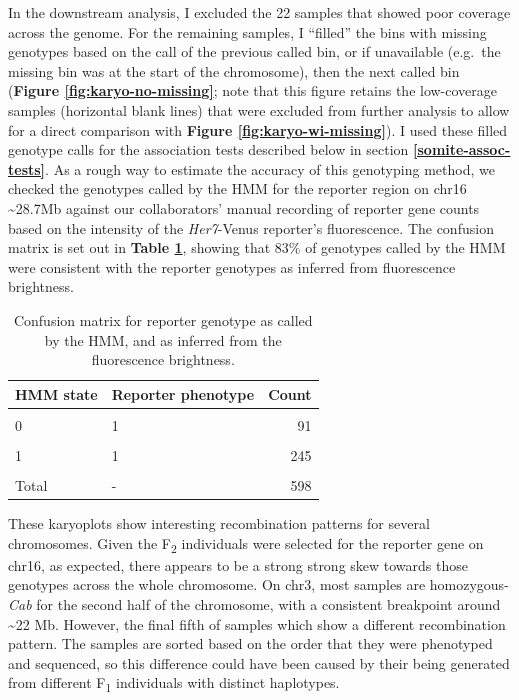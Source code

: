 \documentclass[
]{book}
\begin{document}
In the downstream analysis, I excluded the 22 samples that showed poor coverage across the genome. For the remaining samples, I ``filled'' the bins with missing genotypes based on the call of the previous called bin, or if unavailable (e.g.~the missing bin was at the start of the chromosome), then the next called bin (\textbf{Figure \ref{fig:karyo-no-missing}}; note that this figure retains the low-coverage samples (horizontal blank lines) that were excluded from further analysis to allow for a direct comparison with \textbf{Figure \ref{fig:karyo-wi-missing}}). I used these filled genotype calls for the association tests described below in section \textbf{\ref{somite-assoc-tests}}. As a rough way to estimate the accuracy of this genotyping method, we checked the genotypes called by the HMM for the reporter region on chr16 \textasciitilde28.7Mb against our collaborators' manual recording of reporter gene counts based on the intensity of the \emph{Her7}-Venus reporter's fluorescence. The confusion matrix is set out in \textbf{Table \ref{tab:reporter-conc-tbl}}, showing that 83\% of genotypes called by the HMM were consistent with the reporter genotypes as inferred from fluorescence brightness.

\begin{table}

\caption{\label{tab:reporter-conc-tbl}Confusion matrix for reporter genotype as called by the HMM, and as inferred from the fluorescence brightness.}
\centering
\begin{tabular}[t]{llr}
\toprule
HMM state & Reporter phenotype & Count\\
\midrule
\cellcolor{gray!6}{0} & \cellcolor{gray!6}{0} & \cellcolor{gray!6}{252}\\
0 & 1 & 91\\
\cellcolor{gray!6}{1} & \cellcolor{gray!6}{0} & \cellcolor{gray!6}{9}\\
1 & 1 & 245\\
\cellcolor{gray!6}{2} & \cellcolor{gray!6}{1} & \cellcolor{gray!6}{1}\\
\addlinespace
Total & - & 598\\
\bottomrule
\end{tabular}
\end{table}

These karyoplots show interesting recombination patterns for several chromosomes. Given the F\textsubscript{2} individuals were selected for the reporter gene on chr16, as expected, there appears to be a strong strong skew towards those genotypes across the whole chromosome. On chr3, most samples are homozygous-\emph{Cab} for the second half of the chromosome, with a consistent breakpoint around \textasciitilde22 Mb. However, the final fifth of samples which show a different recombination pattern. The samples are sorted based on the order that they were phenotyped and sequenced, so this difference could have been caused by their being generated from different F\textsubscript{1} individuals with distinct haplotypes.
\end{document}
